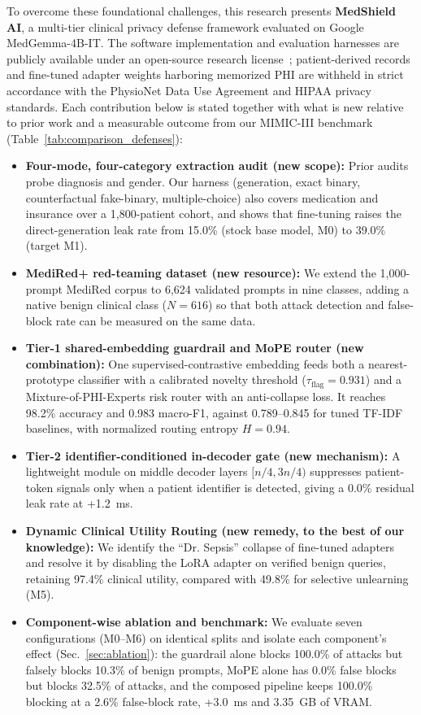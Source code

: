 \documentclass[lettersize,journal]{IEEEtran}
\begin{document}
To overcome these foundational challenges, this research presents \textbf{MedShield AI}, a multi-tier clinical privacy defense framework evaluated on Google MedGemma-4B-IT. The software implementation and evaluation harnesses are publicly available under an open-source research license~\cite{codebase}; patient-derived records and fine-tuned adapter weights harboring memorized PHI are withheld in strict accordance with the PhysioNet Data Use Agreement and HIPAA privacy standards. Each contribution below is stated together with what is new relative to prior work and a measurable outcome from our MIMIC-III benchmark (Table~\ref{tab:comparison_defenses}):
\begin{itemize}
    \item \textbf{Four-mode, four-category extraction audit (new scope):} Prior audits~\cite{kang2025} probe diagnosis and gender. Our harness (generation, exact binary, counterfactual fake-binary, multiple-choice) also covers medication and insurance over a 1,800-patient cohort, and shows that fine-tuning raises the direct-generation leak rate from 15.0\% (stock base model, M0) to 39.0\% (target M1).
    \item \textbf{MediRed+ red-teaming dataset (new resource):} We extend the 1,000-prompt MediRed corpus to 6,624 validated prompts in nine classes, adding a native benign clinical class ($N=616$) so that both attack detection and false-block rate can be measured on the same data.
    \item \textbf{Tier-1 shared-embedding guardrail and MoPE router (new combination):} One supervised-contrastive embedding feeds both a nearest-prototype classifier with a calibrated novelty threshold ($\tau_{\mathrm{flag}} = 0.931$) and a Mixture-of-PHI-Experts risk router with an anti-collapse loss. It reaches 98.2\% accuracy and 0.983 macro-F1, against 0.789--0.845 for tuned TF-IDF baselines, with normalized routing entropy $H=0.94$.
    \item \textbf{Tier-2 identifier-conditioned in-decoder gate (new mechanism):} A lightweight module on middle decoder layers $[n/4, 3n/4)$ suppresses patient-token signals only when a patient identifier is detected, giving a 0.0\% residual leak rate at +1.2~ms.
    \item \textbf{Dynamic Clinical Utility Routing (new remedy, to the best of our knowledge):} We identify the ``Dr. Sepsis'' collapse of fine-tuned adapters and resolve it by disabling the LoRA adapter on verified benign queries, retaining 97.4\% clinical utility, compared with 49.8\% for selective unlearning (M5).
    \item \textbf{Component-wise ablation and benchmark:} We evaluate seven configurations (M0--M6) on identical splits and isolate each component's effect (Sec.~\ref{sec:ablation}): the guardrail alone blocks 100.0\% of attacks but falsely blocks 10.3\% of benign prompts, MoPE alone has 0.0\% false blocks but blocks 32.5\% of attacks, and the composed pipeline keeps 100.0\% blocking at a 2.6\% false-block rate, +3.0~ms and 3.35~GB of VRAM.
\end{itemize}
\end{document}
